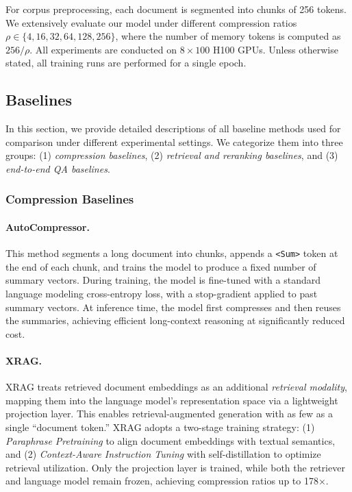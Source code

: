 \documentclass{applemlr}
\numberwithin{equation}{section}
\begin{document}
For corpus preprocessing, each document is segmented into chunks of 256 tokens. 
We extensively evaluate our model under different compression ratios 
$\rho \in \{4, 16, 32, 64, 128, 256\}$, 
where the number of memory tokens is computed as $256 / \rho$.
All experiments are conducted on $8\times100$ H100 GPUs. 
Unless otherwise stated, all training runs are performed for a single epoch.

\subsection{Baselines}
\label{app:baselines}
In this section, we provide detailed descriptions of all baseline methods used for comparison under different experimental settings. 
We categorize them into three groups: (1) \textit{compression baselines}, 
(2) \textit{retrieval and reranking baselines}, 
and (3) \textit{end-to-end QA baselines}.

\subsubsection{Compression Baselines}

\paragraph{AutoCompressor. \citep{chevalier-etal-2023-adapting}} 
This method segments a long document into chunks, appends a \texttt{<Sum>} token at the end of each chunk, 
and trains the model to produce a fixed number of summary vectors. 
During training, the model is fine-tuned with a standard language modeling cross-entropy loss, 
with a stop-gradient applied to past summary vectors. 
At inference time, the model first compresses and then reuses the summaries, 
achieving efficient long-context reasoning at significantly reduced cost.

\paragraph{XRAG. \citep{10.5555/3737916.3741392}}
XRAG treats retrieved document embeddings as an additional \textit{retrieval modality}, 
mapping them into the language model’s representation space via a lightweight projection layer. 
This enables retrieval-augmented generation with as few as a single ``document token.'' 
XRAG adopts a two-stage training strategy: 
(1) \textit{Paraphrase Pretraining} to align document embeddings with textual semantics, and 
(2) \textit{Context-Aware Instruction Tuning} with self-distillation to optimize retrieval utilization. 
Only the projection layer is trained, while both the retriever and language model remain frozen, 
achieving compression ratios up to 178×.
\end{document}
